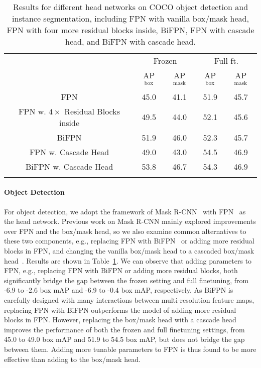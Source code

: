 \documentclass{article}
\begin{document}
\begin{table}[h]
        \centering
\addtolength{\tabcolsep}{3.0pt}
        \begin{tabular}{c|cc|cc}
            \Xhline{1.0pt}
            \multirow{2}{*}{Head Network} & \multicolumn{2}{c|}{Frozen} & \multicolumn{2}{c}{Full ft.} \\
            & AP$^\text{box}$ & AP$^\text{mask}$ & AP$^\text{box}$ & AP$^\text{mask}$ \\
            \hline
            FPN & 45.0 & 41.1 & 51.9 & 45.7  \\
            FPN w. $4\times$ Residual Blocks inside & 49.5 & 44.0 & 52.1 & 45.6 \\
            BiFPN & 51.9 & 46.0 & 52.3 & 45.7 \\
            FPN w. Cascade Head & 49.0 & 43.0 & 54.5 & 46.9 \\
            BiFPN w. Cascade Head & 53.8 & 46.7 & 54.3 & 46.9 \\
          \Xhline{1.0pt}  
       \end{tabular}
       \caption{Results for different head networks on COCO object detection and instance segmentation, including FPN with vanilla box/mask head, FPN with four more residual blocks inside, BiFPN, FPN with cascade head, and BiFPN with cascade head.}
    \label{tab:param_at_head_coco}
\end{table}

\paragraph{Object Detection} For object detection, we adopt the framework of Mask R-CNN~\cite{Mask-rcnn} with FPN~\cite{FPN} as the head network. Previous work on Mask R-CNN mainly explored improvements over FPN and the box/mask head, so we also examine common alternatives to these two components, e.g., replacing FPN with BiFPN~\cite{tan2020efficientdet} or adding more residual blocks in FPN, and changing the vanilla box/mask head to a cascaded box/mask head~\cite{cai2018cascade}. Results are shown in Table~\ref{tab:param_at_head_coco}. 
We can observe that adding parameters to FPN, e.g., replacing FPN with BiFPN or adding more residual blocks, both significantly bridge the gap between the frozen setting and full finetuning, from -6.9 to -2.6 box mAP and -6.9 to -0.4 box mAP, respectively. As BiFPN is carefully designed with many interactions between multi-resolution feature maps, replacing FPN with BiFPN outperforms the model of adding more residual blocks in FPN. However, replacing the box/mask head with a cascade head~\cite{cai2018cascade} improves the performance of both the frozen and full finetuning settings, from 45.0 to 49.0 box mAP and 51.9 to 54.5 box mAP, but does not bridge the gap between them. 
Adding more tunable parameters to FPN is thus found to be more effective than adding to the box/mask head.
\end{document}
